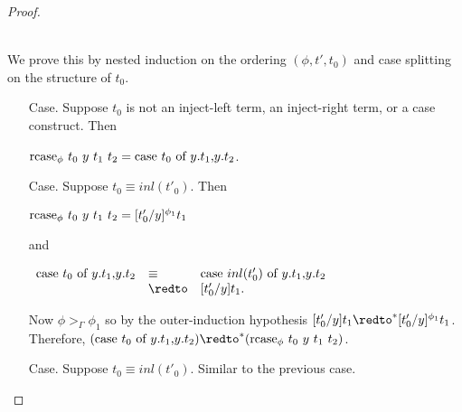 \begin{proof}
\begin{itemize}
  \ \\
  We prove this by nested induction on the ordering $(\phi,t',t_0)$ and case splitting on
  the structure of $t_0$.  
  \begin{itemize}
  \item[Case.] Suppose $t_0$ is not an inject-left term, an inject-right term, or a case construct.  Then
    \begin{center}
      $\mbox{rcase}_{\phi}\ t_0\ y\ t_1\ t_2 = \mbox{case}\ t_0\ \text{of}\ y\text{.}t_1\text{,}y\text{.}t_2$.
    \end{center}
    
  \item[Case.] Suppose $t_0 \equiv inl(t'_0)$.  Then 
    \begin{center}
      $\mbox{rcase}_{\phi}\ t_0\ y\ t_1\ t_2 = [t'_0/y]^{\phi_1} t_1$
    \end{center}
    and
    \begin{center}
      \begin{math}
        \begin{array}{lll}
          \ccon{t_0}{y}{t_1}{t_2} & \equiv & \ccon{inl(t'_0)}{y}{t_1}{t_2}\\
          & \redto & [t'_0/y]t_1.
        \end{array}
      \end{math}
    \end{center}
    Now $\phi >_{\Gamma} \phi_1$ so by the outer-induction hypothesis 
    $[t'_0/y]t_1 \redto^* [t'_0/y]^{\phi_1} t_1$.  Therefore, 
    $(\ccon{t_0}{y}{t_1}{t_2}) \redto^* (\rcase{\phi}{t_0}{y}{t_1}{t_2})$.
    
  \item[Case.] Suppose $t_0 \equiv inl(t'_0)$.  Similar to the previous case.
    

\end{itemize}
\end{itemize}
\end{proof}

